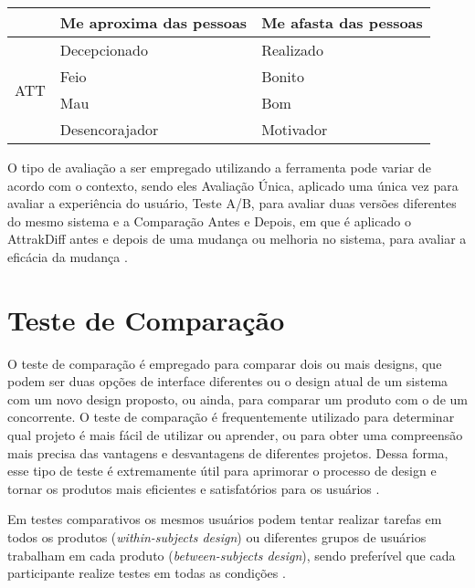 \begin{table}[h]
\begin{tabular}{|c|ll|}
                         & \multicolumn{1}{l|}{Me aproxima das pessoas} & Me afasta das pessoas \\ \hline
    \multirow{4}{*}{ATT} & \multicolumn{1}{l|}{Decepcionado}            & Realizado             \\ \cline{2-3} 
                         & \multicolumn{1}{l|}{Feio}                    & Bonito                \\ \cline{2-3} 
                         & \multicolumn{1}{l|}{Mau}                     & Bom                   \\ \cline{2-3} 
                         & \multicolumn{1}{l|}{Desencorajador}          & Motivador             \\ \hline
    \end{tabular}
\end{table}

O tipo de avaliação a ser empregado utilizando a ferramenta pode variar de acordo com o contexto, sendo eles Avaliação Única, aplicado uma única vez para avaliar 
a experiência do usuário, Teste A/B, para avaliar duas versões diferentes do mesmo sistema e a Comparação Antes e Depois, em que é aplicado o AttrakDiff antes e 
depois de uma mudança ou melhoria no sistema, para avaliar a eficácia da mudança \cite{nzongo2018}.

\section{Teste de Comparação}
\label{sec:Teste de Comparação}

O teste de comparação é empregado para comparar dois ou mais designs, que podem ser duas opções de interface diferentes ou o design atual de um sistema com um novo 
design proposto, ou ainda, para comparar um produto com o de um concorrente. O teste de comparação é frequentemente utilizado para determinar qual projeto é mais fácil 
de utilizar ou aprender, ou para obter uma compreensão mais precisa das vantagens e desvantagens de diferentes projetos. Dessa forma, esse tipo de teste é extremamente 
útil para aprimorar o processo de design e tornar os produtos mais eficientes e satisfatórios para os usuários \cite{rubin2011}.

Em testes comparativos os mesmos usuários podem tentar realizar tarefas em todos os produtos (\textit{within-subjects design}) ou diferentes grupos de usuários trabalham em cada 
produto (\textit{between-subjects design}), sendo preferível que cada participante realize testes em todas as condições \cite{lewis2016}. 

